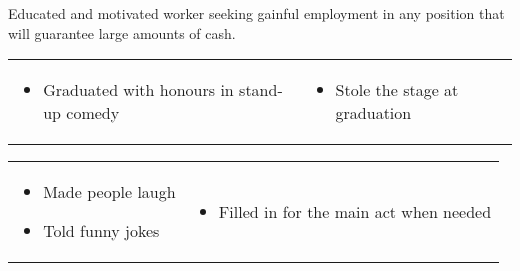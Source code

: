 \documentclass[letterpaper,10pt]{resume}
\begin{document}
\contact{\myfullname}{\addresstop}{\addressbottom}{\myurl}{\myemail}{\myphone}


	\begin{body}
	Educated and motivated worker seeking gainful employment in any position
	that will guarantee large amounts of cash.
	\end{body}

	\begin{body}
		\begin{tabular}{p{} p{}}
			\begin{itemize}
			\item Graduated with honours in stand-up comedy
			\end{itemize}
		&
			\begin{itemize}
			\item Stole the stage at graduation
			\end{itemize}
		\end{tabular}

	\medskip

		\begin{changemargin}{0.2in}{0in}
			\begin{tabular}{p{0.5\textwidth} p{}}
				\begin{itemize}
				\item Made people laugh
				\item Told funny jokes
				\end{itemize}
			&
				\begin{itemize}
				\item Filled in for the main act when needed
				\end{itemize}
			\end{tabular}
		\end{changemargin}
	\end{body}
\end{document}
